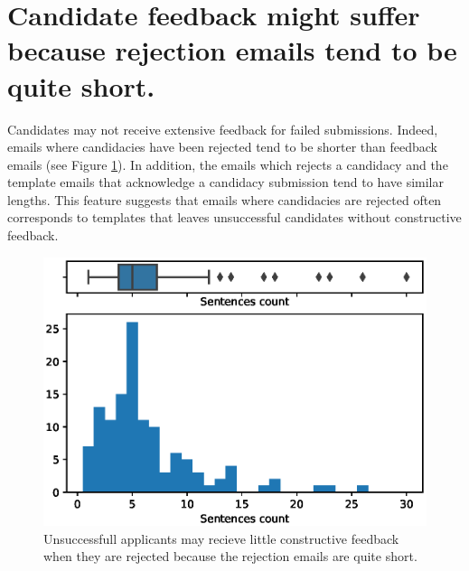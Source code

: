 \documentclass[12pt]{article}
\begin{document}
\section{Candidate feedback might suffer because rejection emails tend to be quite short.}
Candidates may not receive extensive feedback for failed submissions. Indeed, emails where candidacies have been rejected tend to be shorter than feedback emails (see Figure \ref{fig:email_lengths}). In addition, the emails which rejects a candidacy and the template emails that acknowledge a candidacy submission tend to have similar lengths. This feature suggests that emails where candidacies are rejected often corresponds to templates that leaves unsuccessful candidates without constructive feedback. 

\begin{figure}
\includegraphics[width = \linewidth]{message_length_distribution.eps}
\caption{Unsuccessfull applicants may recieve little constructive feedback when they are rejected because the rejection emails are quite short. \label{fig:email_lengths}}
\end{figure}
\end{document}
